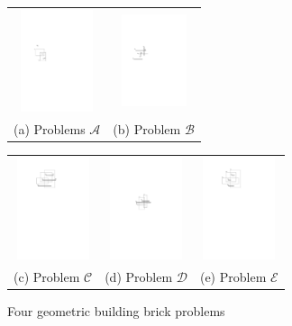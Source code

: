 \documentclass[acmsmall,review,anonymous]{acmart}
\def\figcapup{\vspace{-2mm}}
\def\figcapdown{\vspace{-3mm}}
\begin{document}
\begin{figure}
    \begin{tabular}{cc}
        \includegraphics[height=30mm]{./artwork/prob-a} &
        \includegraphics[height=27mm]{./artwork/prob-b}  \\[2mm]
        (a) Problems $\mathscr{A}$ &
        \hspace{3mm}
        (b) Problem $\mathscr{B}$ \\[3mm]
    \end{tabular}
    \begin{tabular}{ccc}
        \includegraphics[height=30mm]{./artwork/prob-c} &
        \includegraphics[height=30mm]{./artwork/prob-d} &
        \includegraphics[height=30mm]{./artwork/prob-e} \\[2mm]
        (c) Problem $\mathscr{C}$ &
        (d) Problem $\mathscr{D}$ &
        (e) Problem $\mathscr{E}$
    \end{tabular}

    \figcapup
    \caption{Four geometric building brick problems}
    \label{fig:probs}
    \figcapdown
\end{figure}
\end{document}
